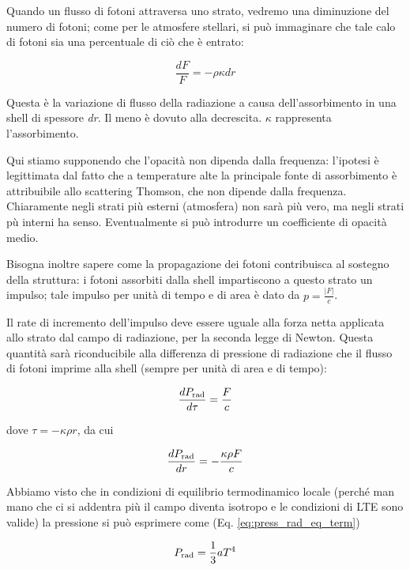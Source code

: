 Quando un flusso di fotoni attraversa uno strato, vedremo una diminuzione del numero di fotoni; come per le atmosfere stellari, si può immaginare che tale calo di fotoni sia una percentuale di ciò che è entrato:

$$\frac{dF}{F}=-\rho\kappa dr$$

Questa è la variazione di flusso della radiazione a causa dell'assorbimento in una shell di spessore \textit{dr}. Il meno è dovuto alla decrescita. $\kappa$ rappresenta l'assorbimento.

Qui stiamo supponendo che l'opacità non dipenda dalla frequenza: l'ipotesi è legittimata dal fatto che a temperature alte la principale fonte di assorbimento è attribuibile allo scattering Thomson, che non dipende dalla frequenza. Chiaramente negli strati più esterni (atmosfera) non sarà più vero, ma negli strati pù interni ha senso. Eventualmente si può introdurre un coefficiente di opacità medio.

Bisogna inoltre sapere come la propagazione dei fotoni contribuisca al sostegno della struttura: i fotoni assorbiti dalla shell impartiscono a questo strato un impulso; tale impulso per unità di tempo e di area è dato da $p=\frac{|F|}{c}$.

Il rate di incremento dell'impulso deve essere uguale alla forza netta applicata allo strato dal campo di radiazione, per la seconda legge di Newton. Questa quantità sarà riconducibile alla differenza di pressione di radiazione che il flusso di fotoni imprime alla shell (sempre per unità di area e di tempo):

\begin{equation}
    \frac{dP_{\rm rad}}{d \tau}=\frac{F}{c}
\end{equation}

dove $\tau=-\kappa \rho r$, da cui

\begin{equation}
    \frac{dP_{\rm rad}}{d r}=-\frac{\kappa \rho F}{c}
\end{equation}


Abbiamo visto che in condizioni di equilibrio termodinamico locale (perché man mano che ci si addentra più il campo diventa isotropo e le condizioni di LTE sono valide) la pressione si può esprimere come (Eq. \eqref{eq:press_rad_eq_term})

$$P_{\rm rad}=\frac{1}{3} aT^4$$

